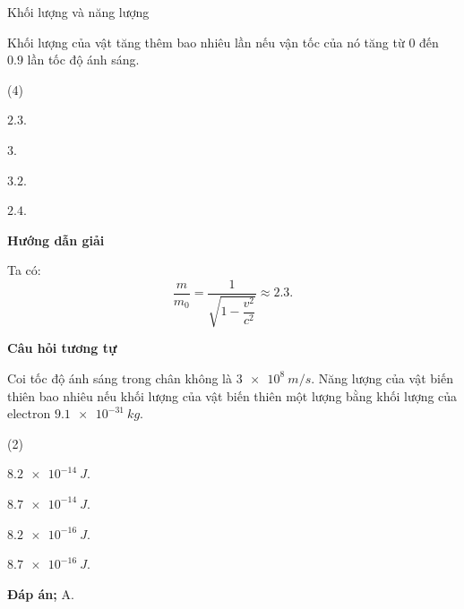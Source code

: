 \begin{dang}{Khối lượng và năng lượng}
{
Khối lượng của vật tăng thêm bao nhiêu lần nếu vận tốc của nó tăng từ $ 0 $ đến $ \num{0,9} $ lần tốc độ ánh sáng.
\begin{mcq}(4)
	\item $ \num{2,3} $.
	\item $ \num{3} $.
	\item $ \num{3,2} $.
	\item $ \num{2,4} $.
\end{mcq}
}
{
\begin{center}
	\textbf{Hướng dẫn giải}
\end{center}
Ta có:
$$
	\dfrac{m}{m_{0}} = \dfrac{1}{\sqrt{1-\dfrac{v^{2}}{c^{2}}}} \approx \num{2,3}.
$$
\begin{center}
	\textbf{Câu hỏi tương tự}
\end{center}
Coi tốc độ ánh sáng trong chân không là $ \SI{3 e8}{m/s} $. Năng lượng của vật biến thiên bao nhiêu nếu khối lượng của vật biến thiên một lượng bằng khối lượng của electron $ \SI{9,1 e-31}{kg} $.
\begin{mcq}(2)
	\item $ \SI{8,2 e-14}{J} $.
	\item $ \SI{8,7 e-14}{J} $.
	\item $ \SI{8,2 e-16}{J} $.
	\item $ \SI{8,7 e-16}{J} $.
\end{mcq}
\textbf{Đáp án;} A.
}
		
\end{dang}


